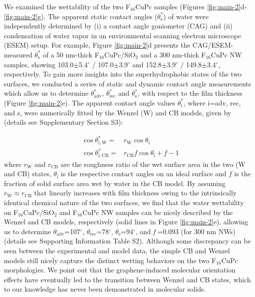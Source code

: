 We examined the wettability of the two F\(_{\text{16}}\)CuPc samples (Figures
\ref{fig:main-2}d-\ref{fig:main-2}g). The apparent static contact
angles (\(\theta_{\mathrm{s}}^{*}\)) of water were independently
determined by (i) a contact angle goniometer (CAG) and (ii) condensation
of  water vapor in an environmental scanning electron
microscope (ESEM) setup. For example, Figure \ref{fig:main-2}d
presents the CAG/ESEM-measured \(\theta_{\mathrm{s}}^{*}\) of a 50 nm-thick
F\(_{\text{16}}\)CuPc/SiO\(_{\text{2}}\) and a 300 nm-thick F\(_{\text{16}}\)CuPc NW samples, showing
103.0\(\pm\)5.4\(^{\circ}\) / 107.0\(\pm\)3.9\(^{\circ}\) and
152.8\(\pm\)3.9\(^{\circ}\) / 149.8\(\pm\)3.4\(^{\circ}\),
respectively. To gain more insights into the superhydrophobic states
of the two surfaces, we conducted a series of static and dynamic
contact angle measurements which allow us to determine
\(\theta_{\mathrm{adv}}^{*}\), \(\theta_{\mathrm{rec}}^{*}\) and
\(\theta_{\mathrm{s}}^{*}\), with respect to the film thickness (Figure
\ref{fig:main-2}e). The apparent contact angle values
\(\theta_{\mathrm{i}}^{*}\), where i=adv, rec, and s, were numerically
fitted by the Wenzel (W) \cite{Wenzel_1936} and CB \cite{Cassie_1944}
models, given by (details see Supplementary Section S3):

\begin{eqnarray}
\label{eq:2}
&\cos \theta^{*}_{\mathrm{i,W}} =& r_{\mathrm{W}} \cos \theta_{\mathrm{i}} \\
&\cos \theta^{*}_{\mathrm{i,CB}} =& r_{\mathrm{CB}} f \cos \theta_{\mathrm{i}} + f - 1
\end{eqnarray}
where \(r_{\mathrm{W}}\) and \(r_{\mathrm{CB}}\) are the roughness ratio
of the wet surface area in the two (W and CB) states,
\(\theta_{\mathrm{i}}\) is the respective contact angles on an ideal
surface and \(f\) is the fraction of solid surface area wet by water in
the CB model. By assuming \(r_{\mathrm{W}} \approx r_{\mathrm{CB}}\)
that linearly increases with film thickness owing to the
intrinsically identical chemical nature of the two surfaces, we find
that the water wettability on F\(_{\text{16}}\)CuPc/SiO\(_{\text{2}}\) and F\(_{\text{16}}\)CuPc NW
samples can be nicely described by the Wenzel and CB models,
respectively (solid lines in Figure \ref{fig:main-2}e), allowing us to
determine \(\theta_{\mathrm{adv}}\)=107\(^{\circ}\),
\(\theta_{\mathrm{rec}}\)=78\(^{\circ}\),
\(\theta_{\mathrm{s}}\)=94\(^{\circ}\), and \emph{f} =0.093 (for 300 nm
NWs) (details see Supporting Information Table S2).  Although some discrepancy
can be seen between the experimental and model data, the simple CB
and Wenzel models still nicely capture the distinct wetting behaviors
on the two F\(_{\text{16}}\)CuPc morphologies. We point out that the
graphene-induced molecular orientation effects have eventually led to
the transition between Wenzel and CB states, which to our knowledge
has never been demonstrated in molecular solids.

